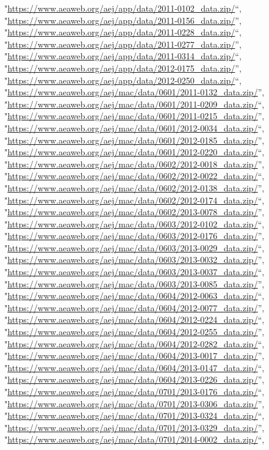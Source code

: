 \documentclass[]{article}
\begin{document}
\begin{itemize}
  "\url{https://www.aeaweb.org/aej/app/data/2011-0102_data.zip/}``,
  "\url{https://www.aeaweb.org/aej/app/data/2011-0156_data.zip/}'',
  "\url{https://www.aeaweb.org/aej/app/data/2011-0228_data.zip/}``,
  "\url{https://www.aeaweb.org/aej/app/data/2011-0277_data.zip/}'',
  "\url{https://www.aeaweb.org/aej/app/data/2011-0314_data.zip/}``,
  "\url{https://www.aeaweb.org/aej/app/data/2012-0175_data.zip/}'',
  "\url{https://www.aeaweb.org/aej/app/data/2012-0250_data.zip/}``,
  "\url{https://www.aeaweb.org/aej/mac/data/0601/2011-0132_data.zip/}'',
  "\url{https://www.aeaweb.org/aej/mac/data/0601/2011-0209_data.zip/}``,
  "\url{https://www.aeaweb.org/aej/mac/data/0601/2011-0215_data.zip/}'',
  "\url{https://www.aeaweb.org/aej/mac/data/0601/2012-0034_data.zip/}``,
  "\url{https://www.aeaweb.org/aej/mac/data/0601/2012-0185_data.zip/}'',
  "\url{https://www.aeaweb.org/aej/mac/data/0601/2012-0220_data.zip/}``,
  "\url{https://www.aeaweb.org/aej/mac/data/0602/2012-0018_data.zip/}'',
  "\url{https://www.aeaweb.org/aej/mac/data/0602/2012-0022_data.zip/}``,
  "\url{https://www.aeaweb.org/aej/mac/data/0602/2012-0138_data.zip/}'',
  "\url{https://www.aeaweb.org/aej/mac/data/0602/2012-0174_data.zip/}``,
  "\url{https://www.aeaweb.org/aej/mac/data/0602/2013-0078_data.zip/}'',
  "\url{https://www.aeaweb.org/aej/mac/data/0603/2012-0102_data.zip/}``,
  "\url{https://www.aeaweb.org/aej/mac/data/0603/2012-0176_data.zip/}'',
  "\url{https://www.aeaweb.org/aej/mac/data/0603/2013-0029_data.zip/}``,
  "\url{https://www.aeaweb.org/aej/mac/data/0603/2013-0032_data.zip/}'',
  "\url{https://www.aeaweb.org/aej/mac/data/0603/2013-0037_data.zip/}``,
  "\url{https://www.aeaweb.org/aej/mac/data/0603/2013-0085_data.zip/}'',
  "\url{https://www.aeaweb.org/aej/mac/data/0604/2012-0063_data.zip/}``,
  "\url{https://www.aeaweb.org/aej/mac/data/0604/2012-0077_data.zip/}'',
  "\url{https://www.aeaweb.org/aej/mac/data/0604/2012-0224_data.zip/}``,
  "\url{https://www.aeaweb.org/aej/mac/data/0604/2012-0255_data.zip/}'',
  "\url{https://www.aeaweb.org/aej/mac/data/0604/2012-0282_data.zip/}``,
  "\url{https://www.aeaweb.org/aej/mac/data/0604/2013-0017_data.zip/}'',
  "\url{https://www.aeaweb.org/aej/mac/data/0604/2013-0147_data.zip/}``,
  "\url{https://www.aeaweb.org/aej/mac/data/0604/2013-0226_data.zip/}'',
  "\url{https://www.aeaweb.org/aej/mac/data/0701/2013-0176_data.zip/}``,
  "\url{https://www.aeaweb.org/aej/mac/data/0701/2013-0306_data.zip/}'',
  "\url{https://www.aeaweb.org/aej/mac/data/0701/2013-0324_data.zip/}``,
  "\url{https://www.aeaweb.org/aej/mac/data/0701/2013-0329_data.zip/}'',
  "\url{https://www.aeaweb.org/aej/mac/data/0701/2014-0002_data.zip/}``,

\end{itemize}
\end{document}
